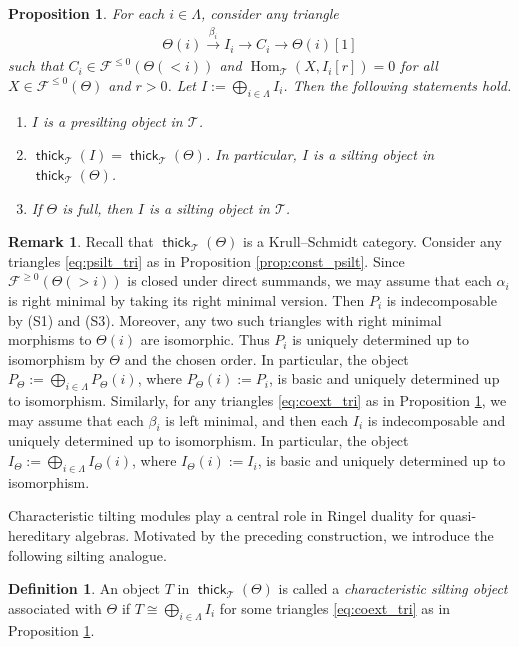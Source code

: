 \documentclass[a4paper,reqno,11pt]{amsart}
\numberwithin{equation}{section}
\newtheorem{proposition}[theorem]{Proposition}
\theoremstyle{definition}
\newtheorem{definition}[theorem]{Definition}
\newtheorem{remark}[theorem]{Remark}
\newcommand{\F}{\mathcal{F}}
\newcommand{\T}{\mathcal{T}}
\newcommand{\bte}{\Theta}
\newcommand{\xto}{\xrightarrow}
\DeclareMathOperator{\thick}{\mathsf{thick}}
\DeclareMathOperator{\Hom}{Hom}
\begin{document}
\begin{proposition}\label{prop:coext_silting}
For each $i\in\Lambda$, consider any triangle
\begin{align}\label{eq:coext_tri}
\bte(i)\xto{\beta_{i}}I_{i}\to C_{i}\to\bte(i)[1]
\end{align}
such that $C_{i}\in\F^{\leq 0}(\bte(<i))$ and $\Hom_{\T}(X,I_{i}[r])=0$ for all $X\in\F^{\leq 0}(\bte)$ and $r>0$.
Let $I:=\bigoplus_{i\in\Lambda}I_{i}$.
Then the following statements hold.
\begin{enumerate}
\item $I$ is a presilting object in $\T$.
\item $\thick_{\T}(I)=\thick_{\T}(\bte)$. In particular, $I$ is a silting object in $\thick_{\T}(\bte)$.
\item If $\bte$ is full, then $I$ is a silting object in $\T$.
\end{enumerate}
\end{proposition}

\begin{remark}\label{rem:DR-minimal}
Recall that $\thick_{\T}(\bte)$ is a Krull--Schmidt category.
Consider any triangles \eqref{eq:psilt_tri} as in Proposition \ref{prop:const_psilt}.
Since $\F^{\geq 0}(\bte(>i))$ is closed under direct summands, we may assume that each $\alpha_{i}$ is right minimal by taking its right minimal version.
Then $P_{i}$ is indecomposable by (S1) and (S3).
Moreover, any two such triangles with right minimal morphisms to $\bte(i)$ are isomorphic.
Thus $P_{i}$ is uniquely determined up to isomorphism by $\bte$ and the chosen order.
In particular, the object $P_{\bte}:=\bigoplus_{i\in\Lambda}P_{\bte}(i)$, where $P_{\bte}(i):=P_{i}$, is basic and uniquely determined up to isomorphism.
Similarly, for any triangles \eqref{eq:coext_tri} as in Proposition \ref{prop:coext_silting}, we may assume that each $\beta_{i}$ is left minimal, and then each $I_{i}$ is indecomposable and uniquely determined up to isomorphism.
In particular, the object $I_{\bte}:=\bigoplus_{i\in\Lambda}I_{\bte}(i)$, where $I_{\bte}(i):=I_{i}$, is basic and uniquely determined up to isomorphism.
\end{remark}

Characteristic tilting modules play a central role in Ringel duality for quasi-hereditary algebras.
Motivated by the preceding construction, we introduce the following silting analogue.

\begin{definition}
An object $T$ in $\thick_{\T}(\bte)$ is called a \emph{characteristic silting object} associated with $\bte$ if $T\cong\bigoplus_{i\in\Lambda}I_{i}$ for some triangles \eqref{eq:coext_tri} as in Proposition \ref{prop:coext_silting}.
\end{definition}
\end{document}
